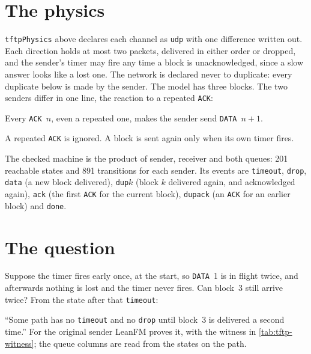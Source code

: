 \section{The physics}

\texttt{tftpPhysics} above declares each channel as \texttt{udp} with one
difference written out. Each direction holds at most two packets, delivered in
either order or dropped, and the sender's timer may fire any time a block is
unacknowledged, since a slow answer looks like a lost one. The network is declared
never to duplicate: every duplicate below is made by the sender. The model has
three blocks. The two senders differ in one line, the reaction to a repeated
\texttt{ACK}:

\begin{description}[style=nextline]
  \item[Original (RFC 783).] Every \texttt{ACK}~$n$, even a repeated one, makes
  the sender send \texttt{DATA}~$n{+}1$.
  \item[Fixed (RFC 1123).] A repeated \texttt{ACK} is ignored. A block is sent
  again only when its own timer fires.
\end{description}

The checked machine is the product of sender, receiver and both queues: 201
reachable states and 891 transitions for each sender. Its events are
\texttt{timeout}, \texttt{drop}, \texttt{data} (a new block delivered),
\texttt{dup}$k$ (block $k$ delivered again, and acknowledged again), \texttt{ack}
(the first \texttt{ACK} for the current block), \texttt{dupack} (an \texttt{ACK}
for an earlier block) and \texttt{done}.

\section{The question}

Suppose the timer fires early once, at the start, so \texttt{DATA}~1 is in flight
twice, and afterwards nothing is lost and the timer never fires. Can block~3 still
arrive twice? From the state after that \texttt{timeout}:


``Some path has no \texttt{timeout} and no \texttt{drop} until block~3 is
delivered a second time.'' For the original sender LeanFM proves it, with the
witness in \cref{tab:tftp-witness}; the queue columns are read from the states on
the path.

